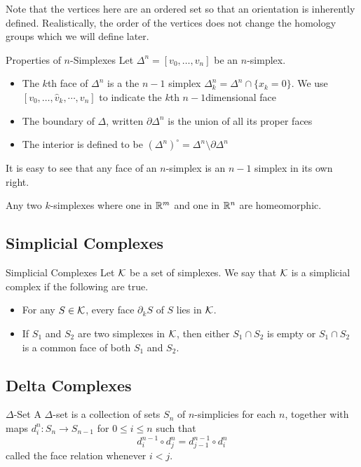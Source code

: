 \documentclass[a4paper]{article}
\begin{document}
Note that the vertices here are an ordered set so that an orientation is inherently defined. Realistically, the order of the vertices does not change the homology groups which we will define later. 

\begin{defn}{Properties of $n$-Simplexes}{} Let $\Delta^n=[v_0,\dots,v_n]$ be an $n$-simplex. 
\begin{itemize}
\item The $k$th face of $\Delta^n$ is a the $n-1$ simplex $\Delta_k^n=\Delta^n\cap\{x_k=0\}$. We use $[v_0,\dots,\hat{v}_k,\cdots,v_n]$ to indicate the $k$th $n-1$dimensional face
\item The boundary of $\Delta$, written $\partial\Delta^n$ is the union of all its proper faces
\item The interior is defined to be $(\Delta^n)^\circ=\Delta^n\setminus\partial\Delta^n$
\end{itemize}
\end{defn}

It is easy to see that any face of an $n$-simplex is an $n-1$ simplex in its own right. 

\begin{lmm}{}{} Any two $k$-simplexes where one in $\mathbb{R}^m$ and one in $\mathbb{R}^n$ are homeomorphic. 
\end{lmm}

\subsection{Simplicial Complexes}
\begin{defn}{Simplicial Complexes}{} Let $\mathcal{K}$ be a set of simplexes. We say that $\mathcal{K}$ is a simplicial complex if the following are true. 
\begin{itemize}
\item For any $S\in\mathcal{K}$, every face $\partial_k S$ of $S$ lies in $\mathcal{K}$. 
\item If $S_1$ and $S_2$ are two simplexes in $\mathcal{K}$, then either $S_1\cap S_2$ is empty or $S_1\cap S_2$ is a common face of both $S_1$ and $S_2$. 
\end{itemize}
\end{defn}

\subsection{Delta Complexes}
\begin{defn}{$\Delta$-Set}{} A $\Delta$-set is a collection of sets $S_n$ of $n$-simplicies for each $n$, together with maps $d_i^n:S_n\to S_{n-1}$ for $0\leq i\leq n$ such that $$d_i^{n-1}\circ d_j^n=d_{j-1}^{n-1}\circ d_i^n$$ called the face relation whenever $i<j$. 
\end{defn}
\end{document}
